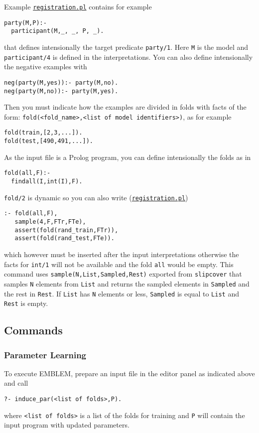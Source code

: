 Example \href{http://cplint.eu/example/learning/registration.pl}{\texttt{registration.pl}} contains for example
\begin{verbatim}
party(M,P):-
  participant(M,_, _, P, _).
\end{verbatim}
that defines intensionally the target predicate \verb|party/1|. Here \verb|M| is the model and \verb|participant/4| is defined in the interpretations.
You can also define intensionally the negative examples with
\begin{verbatim}
neg(party(M,yes)):- party(M,no).
neg(party(M,no)):- party(M,yes).
\end{verbatim}
Then you must indicate how the examples are divided in folds with facts of the form:
\verb|fold(<fold_name>,<list of model identifiers>)|, as for example
\begin{verbatim}
fold(train,[2,3,...]).
fold(test,[490,491,...]).
\end{verbatim}
As the input file is a Prolog program, you can define intensionally the folds as in
\begin{verbatim}
fold(all,F):-
  findall(I,int(I),F).
\end{verbatim}
\verb|fold/2| is dynamic so you can also write (\href{http://cplint.eu/example/learning/registration.pl}{\texttt{registration.pl}})
\begin{verbatim}
:- fold(all,F),
   sample(4,F,FTr,FTe),
   assert(fold(rand_train,FTr)),
   assert(fold(rand_test,FTe)).
\end{verbatim}
which however must be inserted after the input interpretations otherwise the facts for \verb|int/1| will not be available and
the fold \verb|all| would be empty. This command uses  \verb|sample(N,List,Sampled,Rest)| exported from \verb|slipcover| that samples \verb|N| elements from \verb|List| and returns the sampled elements in \verb|Sampled| and the rest in \verb|Rest|. If \verb|List| has \verb|N| elements or less, \verb|Sampled| is equal to \verb|List| 
and \verb|Rest| is empty.

\subsection{Commands}
\subsubsection{Parameter Learning}
To execute EMBLEM, prepare an input file in the editor panel as indicated above 
and call
\begin{verbatim}
?- induce_par(<list of folds>,P).
\end{verbatim}
where \verb|<list of folds>| is a list of the folds for training and
\verb|P| will contain the input program with updated parameters.

